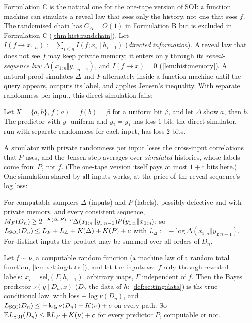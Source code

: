 Formulation C is the natural one for the one-tape version of SOI: a function machine can simulate a reveal law that sees only the history, not one that sees $f$. The randomised chain has $C_\Delta=O(1)$ in Formulation B but is excluded in Formulation C (\cref{thm:hist:randchain}). Let $I(f\to x_{1:n}):=\sum_{i\le n}I(f;x_i\mid h_{i-1})$ (\emph{directed information}). A reveal law that does not see $f$ may keep private memory; it enters only through its \emph{reveal-sequence law} $\Delta(x_{1:n}\Vert y_{1:n-1})$, and $I(f\to x)=0$ (\cref{lem:hist:memory}). A natural proof simulates $\Delta$ and $P$ alternately inside a function machine until the query appears, outputs its label, and applies Jensen's inequality. With separate randomness per input, this direct simulation fails:

\begin{proposition}\label{prop:hist:sketchfails}
Let $X=\{a,b\}$, $f(a)=f(b)=\beta$ for a uniform bit $\beta$, and let $\Delta$ show $a$, then $b$. The predictor with $y_1$ uniform and $y_2=y_1$ has loss $1$ bit; the direct simulator, run with separate randomness for each input, has loss $2$ bits.
\end{proposition}

A simulator with private randomness per input loses the cross-input correlations that $P$ uses, and the Jensen step averages over \emph{simulated} histories, whose labels come from $P$, not $f$. (The one-tape version itself pays at most $1+c$ bits here.) One simulation shared by all inputs works, at the price of the reveal sequence's log loss:

\begin{theorem}\label{thm:hist:shared}
For computable samplers $\Delta$ (inputs) and $P$ (labels), possibly defective and with private memory, and every consistent sequence, $M_{F}(D_n)\ge2^{-K(\Delta,P)-c}\Delta(x_{1:n}\Vert y_{1:n-1})P(y_{1:n}\Vert x_{1:n})$; so $L_{\mathrm{SOI}}(D_n)\le L_P+L_\Delta+K(\Delta)+K(P)+c$ with $L_\Delta:=-\log\Delta(x_{1:n}\Vert y_{1:n-1})$. For distinct inputs the product may be summed over all orders of $D_n$.
\end{theorem}

\begin{theorem}\label{thm:hist:bayes}
Let $f\sim\nu$, a computable random function (a machine law of a random total function, \cref{lem:setting:total}), and let the inputs see $f$ only through revealed labels: $x_i=\mathrm{sel}_i(\Gamma,h_{i-1})$, arbitrary maps, $\Gamma$ independent of $f$. Then the Bayes predictor $\nu(y\mid D_h,x)$ ($D_h$ the data of $h$; \cref{def:setting:data}) is the true conditional law, with loss $-\log\nu(D_n)$, and $L_{\mathrm{SOI}}(D_n)\le-\log\nu(D_n)+K(\nu)+c$ on every path. So $\mathbb{E}L_{\mathrm{SOI}}(D_n)\le\mathbb{E} L_P+K(\nu)+c$ for every predictor $P$, computable or not.
\end{theorem}

